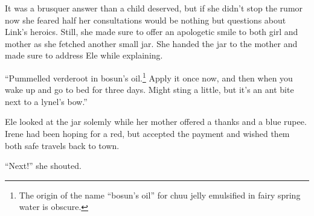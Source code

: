 \documentclass[../../FGP.tex]{subfiles}
\begin{document}
It was a brusquer answer than a child deserved, but if she didn't stop the rumor now she feared half her consultations would be nothing but questions about Link's heroics. Still, she made sure to offer an apologetic smile to both girl and mother as she fetched another small jar. She handed the jar to the mother and made sure to address Ele while explaining. 

``Pummelled verderoot in bosun's oil.\footnote{The origin of the name ``bosun's oil'' for chuu jelly emulsified in fairy spring water is obscure.} Apply it once now, and then when you wake up and go to bed for three days. Might sting a little, but it's an ant bite next to a lynel's bow.'' 

Ele looked at the jar solemly while her mother offered a thanks and a blue rupee. Irene had been hoping for a red, but accepted the payment and wished them both safe travels back to town. 

``Next!'' she shouted. 

 
\end{document}
